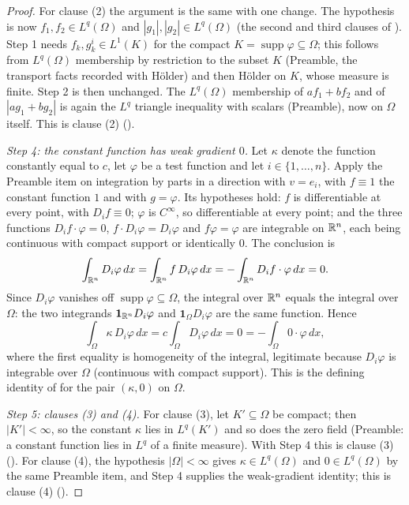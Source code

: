 \begin{proof}
For clause (2) the argument is the same with one change.  The hypothesis is now
$f_1,f_2\in L^q(\Omega)$ and $|g_1|,|g_2|\in L^q(\Omega)$ (the second and third
clauses of ).  Step 1 needs $f_k,g_k^i\in L^1(K)$ for the
compact $K=\operatorname{supp}\varphi\subseteq\Omega$; this follows from
$L^q(\Omega)$ membership by restriction to the subset $K$ (Preamble, the
transport facts recorded with H\"older) and then H\"older on $K$, whose measure
is finite.  Step 2 is then unchanged.  The $L^q(\Omega)$ membership of
$af_1+bf_2$ and of $|ag_1+bg_2|$ is again the $L^q$ triangle inequality with
scalars (Preamble), now on $\Omega$ itself.  This is clause (2)
().

\emph{Step 4: the constant function has weak gradient $0$.}  Let $\kappa$ denote
the function constantly equal to $c$, let $\varphi$ be a test function and let
$i\in\{1,\dots,n\}$.  Apply the Preamble item on integration by parts in a
direction with $v=e_i$, with $f\equiv1$ the constant function $1$ and with
$g=\varphi$.  Its hypotheses hold: $f$ is differentiable at every point, with
$D_if\equiv0$; $\varphi$ is $C^\infty$, so differentiable at every point; and
the three functions $D_if\cdot\varphi=0$, $f\cdot D_i\varphi=D_i\varphi$ and
$f\varphi=\varphi$ are integrable on $\mathbb{R}^n$, each being continuous with compact
support or identically $0$.  The conclusion is
\[
\int_{\mathbb{R}^n}D_i\varphi\,dx=\int_{\mathbb{R}^n}f\,D_i\varphi\,dx
=-\int_{\mathbb{R}^n}D_if\cdot\varphi\,dx=0 .
\]
Since $D_i\varphi$ vanishes off $\operatorname{supp}\varphi\subseteq\Omega$, the
integral over $\mathbb{R}^n$ equals the integral over $\Omega$: the two integrands
$\mathbf1_{\mathbb{R}^n}D_i\varphi$ and $\mathbf1_\Omega D_i\varphi$ are the same
function.  Hence
\[
\int_\Omega\kappa\,D_i\varphi\,dx=c\int_\Omega D_i\varphi\,dx=0
=-\int_\Omega 0\cdot\varphi\,dx ,
\]
where the first equality is homogeneity of the integral, legitimate because
$D_i\varphi$ is integrable over $\Omega$ (continuous with compact support).
This is the defining identity of  for the pair
$(\kappa,0)$ on $\Omega$.

\emph{Step 5: clauses (3) and (4).}  For clause (3), let $K'\subseteq\Omega$ be
compact; then $|K'|<\infty$, so the constant $\kappa$ lies in $L^q(K')$ and so
does the zero field (Preamble: a constant function lies in $L^q$ of a finite
measure).  With Step 4 this is clause (3) ().  For clause
(4), the hypothesis $|\Omega|<\infty$ gives $\kappa\in L^q(\Omega)$ and
$0\in L^q(\Omega)$ by the same Preamble item, and Step 4 supplies the
weak-gradient identity; this is clause (4) ().
\end{proof}
